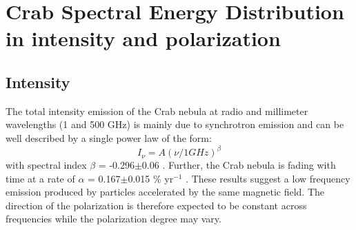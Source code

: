 \documentclass[twocolumn,traditabstract]{aa}
\def\NIKA{\textit{NIKA}}
\def\Planck{\textit{Planck}}
\def\WMAP{\textit{WMAP}}
\begin{document}


\section{Crab Spectral Energy Distribution in intensity and polarization}\label{sec:Polarization intensity Spectral Energy Density (SED)}
\subsection{Intensity}
The total intensity emission of the Crab nebula at radio and millimeter wavelengths (1 and 500 GHz) is mainly due to synchrotron emission and can be well described by a single power law of the form:
\begin{equation}
I_{\nu} = A(\nu / 1 GHz)^{\beta}
\end{equation}\label{eq:sync}
with spectral index $\beta$ = -0.296$\pm$0.06 \citep{baars1977absolute,macias2010}. Further, the Crab nebula is fading with time at a rate of $\alpha$ = 0.167$\pm$0.015 \% yr$^{-1}$ \citep{aller1985decrease}. 
These results suggest a low frequency emission produced by particles accelerated by the same magnetic field. The direction of the polarization is therefore expected to be constant across frequencies while the polarization degree may vary. 
\end{document}
